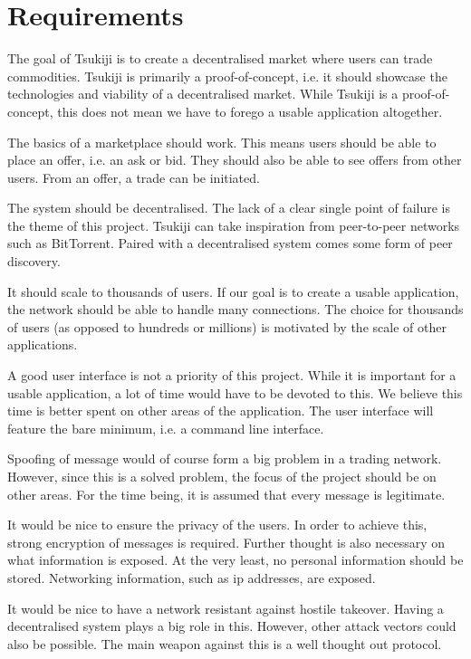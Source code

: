\section{Requirements}
\label{requirements}
The goal of Tsukiji is to create a decentralised market where users can trade commodities.
Tsukiji is primarily a proof-of-concept, i.e. it should showcase the technologies and viability of a decentralised market.
While Tsukiji is a proof-of-concept, this does not mean we have to forego a usable application altogether.

The basics of a marketplace should work.
This means users should be able to place an offer, i.e. an ask or bid.
They should also be able to see offers from other users.
From an offer, a trade can be initiated.

The system should be decentralised.
The lack of a clear single point of failure is the theme of this project.
Tsukiji can take inspiration from peer-to-peer networks such as BitTorrent.
Paired with a decentralised system comes some form of peer discovery.

It should scale to thousands of users.
If our goal is to create a usable application, the network should be able to handle many connections.
The choice for thousands of users (as opposed to hundreds or millions) is motivated by the scale of other applications. %

A good user interface is not a priority of this project.
While it is important for a usable application, a lot of time would have to be devoted to this.
We believe this time is better spent on other areas of the application.
The user interface will feature the bare minimum, i.e. a command line interface.

Spoofing of message would of course form a big problem in a trading network.
However, since this is a solved problem, the focus of the project should be on other areas.
For the time being, it is assumed that every message is legitimate.

It would be nice to ensure the privacy of the users.
In order to achieve this, strong encryption of messages is required.
Further thought is also necessary on what information is exposed.
At the very least, no personal information should be stored.
Networking information, such as ip addresses, are exposed.

It would be nice to have a network resistant against hostile takeover.
Having a decentralised system plays a big role in this.
However, other attack vectors could also be possible.
The main weapon against this is a well thought out protocol.

